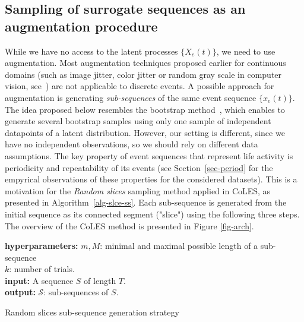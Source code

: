 \documentclass[sigconf, anonymous]{acmart}
\begin{document}
\subsection{Sampling of surrogate sequences as an augmentation procedure} \label{sec-pos-pairs}

While we have no access to the latent processes $\{X_e(t)\}$, we need to use augmentation. Most augmentation techniques proposed earlier for continuous domains (such as image jitter, color jitter or random gray scale in computer vision, see~\citep{Falcon2020AFF}) are not applicable to discrete events. A possible approach for augmentation is generating
{\it sub-sequences} of the same event sequence $\{x_e(t)\}$. The idea proposed below resembles the bootstrap method~\citep{Efron1994Bootstrap}, which enables to generate several bootstrap samples using only one sample of independent datapoints of a latent distribution. However, our setting is different, since we have no independent observations, so we should rely on different data assumptions. 
The key property of event sequences that represent life activity is periodicity and repeatability of its events (see Section~\ref{sec-period} for the empyrical observations of these properties for the considered datasets). This is a motivation for the \textit{Random slices} sampling method applied in CoLES, as presented in Algorithm~\ref{alg-slce-ss}. Each sub-sequence is generated from the initial sequence as its connected segment ("slice") using the following three steps. 
The overview of the CoLES method is presented in Figure \ref{fig-arch}.

\begin{algorithm}
\SetAlgoLined
\textbf{hyperparameters:} $m, M$: minimal and maximal possible length of a sub-sequence\\ $k$: number of trials.\\ %
\textbf{input:} A sequence $S$ of length $T$. \\
\textbf{output:} $\mathcal{S}$: sub-sequences of $S$. \\

\BlankLine
\caption{Random slices sub-sequence generation strategy}
\label{alg-slce-ss}
\end{algorithm}
\end{document}
